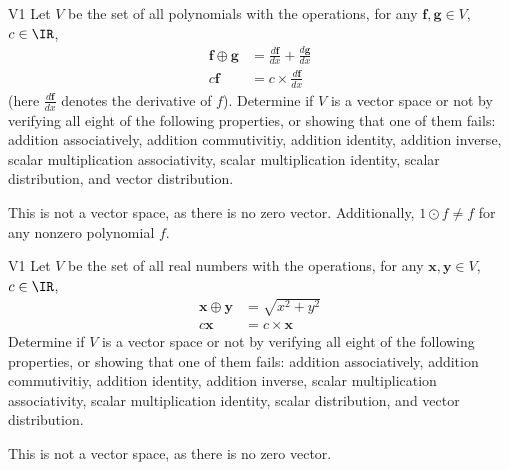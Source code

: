 \begin{problem}{V1}
Let $V$ be the set of all polynomials with the operations, for any $\mathbf{f}, \mathbf{g} \in V$, $c \in \IR$,
\begin{align*}
\mathbf{f} \oplus \mathbf{g} &= \frac{d\mathbf{f}}{dx}+\frac{d\mathbf{g}}{dx} \\
c \mathbf{f} &= c \times\frac{d\mathbf{f}}{dx}
\end{align*}
(here $\frac{d\mathbf{f}}{dx}$ denotes the derivative of $f$).  Determine if $V$ is a vector space or not by verifying all eight of the
following properties, or showing that one of them fails: addition associatively,
addition commutivitiy, addition identity, addition inverse,
scalar multiplication associativity, scalar multiplication identity,
scalar distribution, and vector distribution.
\end{problem}
\begin{solution}
This is not a vector space, as there is no zero vector.  Additionally, $1 \odot f \neq f$ for any nonzero polynomial $f$.
\end{solution}


\begin{problem}{V1}
Let $V$ be the set of all real numbers with the operations, for any $\mathbf{x}, \mathbf{y} \in V$, $c \in \IR$,
\begin{align*}
\mathbf{x} \oplus \mathbf{y} &= \sqrt{x^2+y^2} \\
c \mathbf{x} &= c \times\mathbf{x}
\end{align*}
Determine if $V$ is a vector space or not by verifying all eight of the
following properties, or showing that one of them fails: addition associatively,
addition commutivitiy, addition identity, addition inverse,
scalar multiplication associativity, scalar multiplication identity,
scalar distribution, and vector distribution.
\end{problem}
\begin{solution}
This is not a vector space, as there is no zero vector.
\end{solution}
